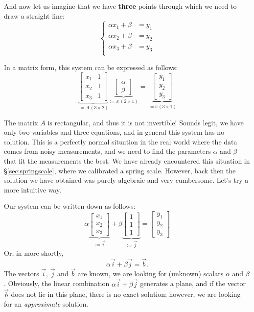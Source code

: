 \documentclass[notitlepage,oneside]{book}
\begin{document}
And now let us imagine that we have \textbf{three} points through which we need to draw a straight line:
$$
\left\{
\begin{split}
\alpha x_1 + \beta &= y_1\\
\alpha x_2 + \beta &= y_2\\
\alpha x_3 + \beta &= y_3\\
\end{split}
\right.
$$

In a matrix form, this system can be expressed as follows:
$$
\underbrace{\begin{bmatrix}x_1  & 1 \\ x_2 & 1 \\x_3 & 1 \end{bmatrix} }_{:= A\,(3\times 2)}
\underbrace{\begin{bmatrix} \alpha \\ \beta \end{bmatrix}}_{:=x\,(2\times 1)} = \underbrace{\begin{bmatrix} y_1 \\ y_2 \\ y_3 \end{bmatrix}}_{:=b\, (3\times 1)}
$$

The matrix $A$ is rectangular, and thus it is not invertible!
Sounds legit, we have only two variables and three equations, and in general this system has no solution.
This is a perfectly normal situation in the real world where the data comes from noisy measurements,
and we need to find the parameters $\alpha$ and $\beta$ that fit the measurements the best.
We have already encountered this situation in \S\ref{sec:springscale}, where we calibrated a spring scale.
However, back then the solution we have obtained was purely algebraic and very cumbersome. Let's try a more intuitive way.

Our system can be written down as follows:
$$
\alpha \underbrace{\begin{bmatrix}x_1  \\ x_2 \\x_3  \end{bmatrix} }_{:=\vec{i}}
+\beta \underbrace{\begin{bmatrix}1 \\ 1 \\1 \end{bmatrix} }_{:=\vec{j}} = 
\begin{bmatrix}y_1\\y_2\\y_3\end{bmatrix}
$$
Or, in more shortly,
$$
\alpha \vec{i} + \beta\vec{j} = \vec{b}.
$$
The vectors $\vec i$, $\vec j$ and $\vec b$ are known, we are looking for (unknown) scalars $\alpha$ and $\beta$.
Obviously, the linear combination $\alpha \vec{i} + \beta\vec{j}$ generates a plane, and if the vector $\vec b$
does not lie in this plane, there is no exact solution; however, we are looking for an \textit{approximate} solution.
\end{document}
